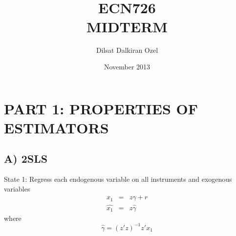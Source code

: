 \documentclass[11pt]{article}
\begin{document}
\title{ECN726 \\ MIDTERM}
\author{Dilsat Dalkiran Ozel}
\date{November 2013}
\maketitle
\section*{PART 1: PROPERTIES OF ESTIMATORS}
\subsection*{A) 2SLS}
State 1: Regress each endogenous variable on all instruments and exogenous variables
\begin{eqnarray}
x_{1}      &=& z \gamma + r \nonumber \\
\hat{x_{1}}&=& z\hat{\gamma} \nonumber
\end{eqnarray}
where 
\begin{equation}
\hat{\gamma} = (z'z)^{-1} z'x_{1} \nonumber
\end{equation}
\end{document}
